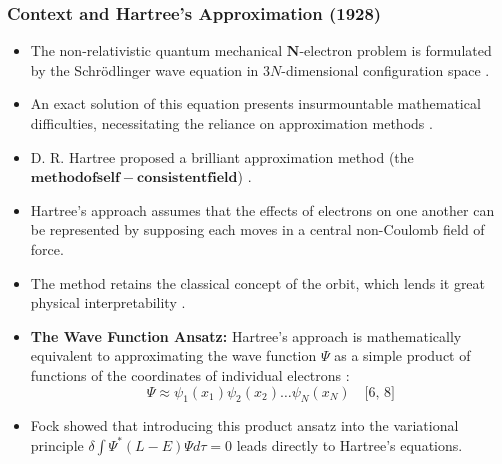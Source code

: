 \begin{frame}
    \frametitle{Context and Hartree's Approximation (1928)}
    \begin{itemize}
        \item The non-relativistic quantum mechanical $\mathbf{N}$-electron problem is formulated by the Schrödlinger wave equation in $3N$-dimensional configuration space .
        \item An exact solution of this equation presents insurmountable mathematical difficulties, necessitating the reliance on approximation methods .
        \item D. R. Hartree proposed a brilliant approximation method (the $\mathbf{method of self-consistent field}$) .
        \item Hartree's approach assumes that the effects of electrons on one another can be represented by supposing each moves in a central non-Coulomb field of force.
        \item The method retains the classical concept of the orbit, which lends it great physical interpretability .
        \item \textbf{The Wave Function Ansatz:} Hartree's approach is mathematically equivalent to approximating the wave function $\Psi$ as a simple product of functions of the coordinates of individual electrons :
        $$\Psi \approx \psi_1(x_1)\psi_2(x_2) \dots \psi_N(x_N) \quad \text{[6, 8]}$$
        \item Fock showed that introducing this product ansatz into the variational principle $\delta \int \Psi^* (L - E) \Psi d\tau = 0$ leads directly to Hartree's equations.
    \end{itemize}
\end{frame}

